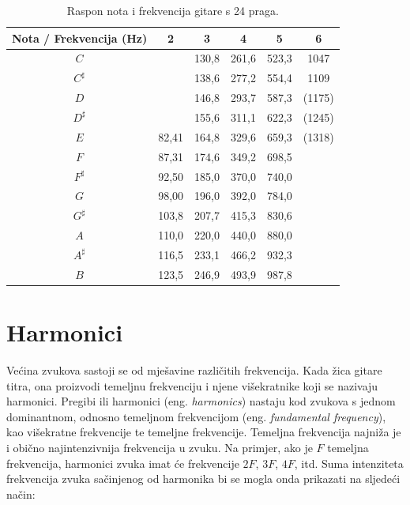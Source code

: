 \documentclass[times, utf8, diplomski, numeric]{fer}
\begin{document}
\begin{table}[h]
	\begin{center}
		\caption{Raspon nota i frekvencija gitare s 24 praga.}
		\begin{tabular}{c|c c c c c}
			Nota / Frekvencija (Hz)  & 2 & 3 & 4 & 5 & 6\\
			\hline
			$C$ & & 130,8 & 261,6 & 523,3 & 1047\\
			\hline
			$C^\sharp$ &  & 138,6 & 277,2 & 554,4 & 1109\\
			\hline
			$D$ & & 146,8 & 293,7 & 587,3 & (1175)\\
			\hline
			$D^\sharp$ & & 155,6 & 311,1 & 622,3 & (1245)\\
			\hline
			$E$ & 82,41 & 164,8 & 329,6 & 659,3 & (1318)\\
			\hline
			$F$ & 87,31 &174,6 & 349,2 & 698,5 & \\
			\hline
			$F^\sharp$ & 92,50 & 185,0 & 370,0 & 740,0 & \\
			\hline
			$G$ & 98,00 & 196,0 & 392,0 & 784,0 & \\
			\hline
			$G^\sharp$ & 103,8 & 207,7 & 415,3 & 830,6 & \\
			\hline
			$A$ & 110,0 & 220,0 & 440,0 & 880,0 & \\
			\hline
			$A^\sharp$ & 116,5 & 233,1 & 466,2 & 932,3 & \\
			\hline
			$B$ & 123,5 & 246,9 & 493,9 & 987,8 & \\
		\end{tabular}
	\end{center}
\end{table}
%

\chapter{Harmonici}
Većina zvukova sastoji se od mješavine različitih frekvencija. Kada žica gitare titra, ona proizvodi temeljnu frekvenciju i njene višekratnike koji se nazivaju harmonici. Pregibi ili harmonici (eng. \textit{harmonics}) nastaju kod zvukova s jednom dominantnom, odnosno temeljnom frekvencijom (eng. \textit{fundamental frequency}), kao višekratne frekvencije te temeljne frekvencije.\cite{sethares2005tuning} Temeljna frekvencija najniža je i obično najintenzivnija frekvencija u zvuku.\cite{teachmeaudio2020} Na primjer, ako je $F$ temeljna frekvencija, harmonici zvuka imat će frekvencije $2F$, $3F$, $4F$, itd. Suma intenziteta frekvencija zvuka sačinjenog od harmonika bi se mogla onda prikazati na sljedeći način:
\end{document}
